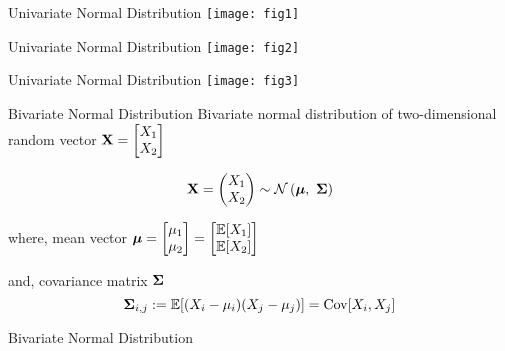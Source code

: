 \documentclass{beamer}
\begin{document}
\begin{frame}{Univariate Normal Distribution}
	\texttt{[image: fig1]} 
\end{frame}

\begin{frame}{Univariate Normal Distribution}
	\texttt{[image: fig2]}
\end{frame}

\begin{frame}{Univariate Normal Distribution}
	\texttt{[image: fig3]}
\end{frame}

\begin{frame}{Bivariate Normal Distribution}
Bivariate normal distribution of two-dimensional random vector $\mathbf{X} =\begin{bmatrix}
X_{1} \\
X_{2} \\
\end{bmatrix}
$

\begin{gather}
	\mathbf{X} = \begin{pmatrix}
	X_1 \\
	X_2
	\end{pmatrix} \sim \mathcal{N}\left(\boldsymbol{\mu}, \ \boldsymbol{\Sigma}\right)
\end{gather}

where, mean vector $\boldsymbol{\mu} =\begin{bmatrix}
\mu_{1} \\
\mu_{2} \\
\end{bmatrix}
=\begin{bmatrix}
\mathbb{E}[X_{1}] \\
\mathbb{E}[X_{2}] \\
\end{bmatrix}
$

and, covariance matrix $\boldsymbol{\Sigma}$
$$\boldsymbol{\Sigma}_{i,j} := \mathbb{E} [(X_i - \mu_i)( X_j - \mu_j)] = \operatorname{Cov}[X_i, X_j] $$
\end{frame}

\begin{frame}{Bivariate Normal Distribution}
	
	
	
	
	
	
	
	
\end{frame}
\end{document}
